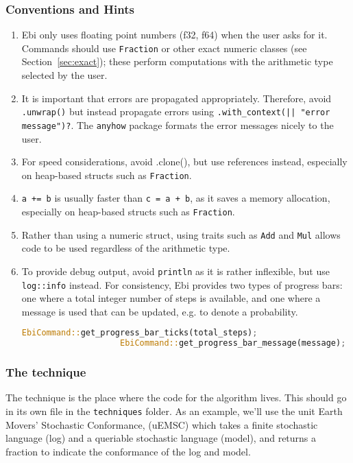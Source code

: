 \documentclass{article}
\begin{document}
		\subsubsection{Conventions and Hints}
			\begin{enumerate}
				\item Ebi only uses floating point numbers (f32, f64) when the user asks for it.
				Commands should use \verb=Fraction= or other exact numeric classes (see Section~\ref{sec:exact}); these perform computations with the arithmetic type selected by the user.
				\item It is important that errors are propagated appropriately.
				Therefore, avoid \verb=.unwrap()= but instead propagate errors using \verb=.with_context(|| "error message")?=.
				The \verb=anyhow= package formats the error messages nicely to the user.
				\item For speed considerations, avoid .clone(), but use references instead, especially on heap-based structs such as \verb=Fraction=.
				\item \verb|a += b| is usually faster than \verb|c = a + b|, as it saves a memory allocation, especially on heap-based structs such as \verb=Fraction=.
				\item Rather than using a numeric struct, using traits such as \verb=Add= and \verb=Mul= allows code to be used regardless of the arithmetic type.
				\item To provide debug output, avoid \verb=println= as it is rather inflexible, but use \verb=log::info= instead.
				For consistency, Ebi provides two types of progress bars: one where a total integer number of steps is available, and one where a message is used that can be updated, e.g. to denote a probability. 
				\begin{lstlisting}[language=Rust, style=boxed]
					EbiCommand::get_progress_bar_ticks(total_steps);
					EbiCommand::get_progress_bar_message(message);
				\end{lstlisting}

			\end{enumerate}
		
		\subsubsection{The technique}
			The technique is the place where the code for the algorithm lives.
			This should go in its own file in the \verb=techniques= folder.
			As an example, we'll use the unit Earth Movers' Stochastic Conformance, (uEMSC) which takes a finite stochastic language (log) and a queriable stochastic language (model), and returns a fraction to indicate the conformance of the log and model.
			
\end{document}
